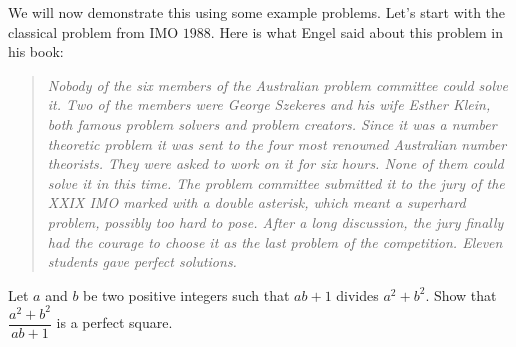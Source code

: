 \documentclass{subfile}
\begin{document}
	We will now demonstrate this using some example problems. Let's start with the classical problem from IMO $1988$. Here is what Engel said about this problem in his book:
		\begin{quote}\slshape
			Nobody of the six members of the Australian problem committee could solve it. Two of the members were George Szekeres and his wife Esther Klein, both famous problem solvers and problem creators. Since it was a number theoretic problem it was sent to the four most renowned Australian number theorists. They were asked to work on it for six hours. None of them could solve it in this time. The problem committee submitted it to the jury of the XXIX IMO marked with a double asterisk, which meant a superhard problem, possibly too hard to pose. After a long discussion, the jury finally had the courage to choose it as the last problem of the competition. Eleven students gave perfect solutions.
		\end{quote}

	\begin{problem}
		Let $ a$ and $ b$ be two positive integers such that $ab + 1$ divides $ a^{2} + b^{2}$. Show that $\dfrac{a^{2}+b^{2}}{ab+1}$ is a perfect square.
	\end{problem}
\end{document}
